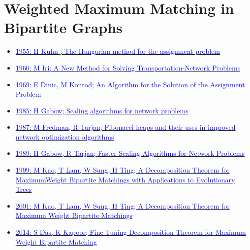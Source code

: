 \documentclass[oneside]{book}
\begin{document}
\section{Weighted Maximum Matching in Bipartite Graphs}
\begin{itemize}
    \item \href{https://onlinelibrary.wiley.com/doi/abs/10.1002/nav.3800020109}{\textcolor{blue}{1955: H Kuhn ; The Hungarian method for the assignment problem}}
    \item \href{https://www.orsj.or.jp/~archive/pdf/e_mag/Vol.03_01_02_027.pdf}{\textcolor{blue}{1960: M Iri; A New Method for Solving Transportation-Network Problems}}
    \item \textcolor{blue}{1969: E Dinic, M Konrod; An Algorithm for the Solution of the Assignment Problem}
    \item \href{https://www.sciencedirect.com/science/article/pii/002200008590039X}{\textcolor{blue}{1985: H Gabow; Scaling algorithms for network problems}}
    \item \href{https://dl.acm.org/doi/10.1145/28869.28874}{\textcolor{blue}{1987: M Fredman, R Tarjan; Fibonacci heaps and their uses in improved network optimization algorithms}}
    \item \href{https://epubs.siam.org/doi/10.1137/0218069}{\textcolor{blue}{1989: H Gabow, R Tarjan; Faster Scaling Algorithms for Network Problems}}
    \item \href{https://link.springer.com/chapter/10.1007\%2F3-540-48481-7_38}{\textcolor{blue}{1999: M Kao, T Lam, W Sung, H Ting; A Decomposition Theorem for MaximumWeight Bipartite Matchings with Applications to Evolutionary Trees}}
    \item \href{https://epubs.siam.org/doi/10.1137/S0097539799361208}{\textcolor{blue}{2001: M Kao, T Lam, W Sung, H Ting; A Decomposition Theorem for Maximum Weight Bipartite Matchings}}
    \item \href{https://link.springer.com/chapter/10.1007\%2F978-3-319-06089-7_22}{\textcolor{blue}{2014: S Das, K Kapoor; Fine-Tuning Decomposition Theorem for Maximum Weight Bipartite Matching}}
\end{itemize}

\newpage
\end{document}
